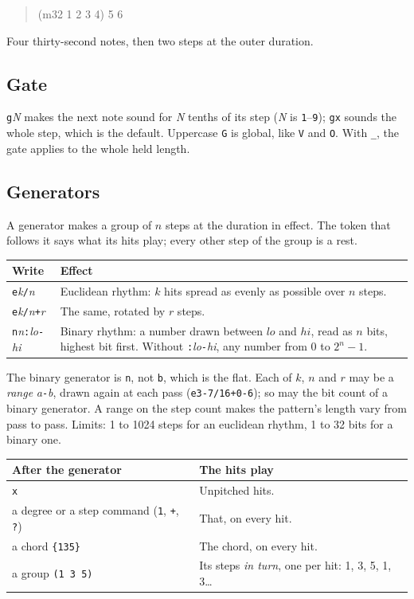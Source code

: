 \documentclass[11pt,a4paper]{article}
\newcommand{\pat}[1]{\texttt{#1}}
\newcommand{\meta}[1]{\textit{#1}}
\newenvironment{patternblock}
  {\begin{quote}\ttfamily\noindent}
  {\end{quote}}
\begin{document}
\begin{patternblock}
(m32 1 2 3 4) 5 6
\end{patternblock}
\noindent
Four thirty-second notes, then two steps at the outer duration.

\subsection{Gate}

\pat{g}\meta{N} makes the next note sound for \meta{N} tenths of its step
(\meta{N} is \pat{1}--\pat{9}); \pat{gx} sounds the whole step, which is the
default. Uppercase \pat{G} is global, like \pat{V} and \pat{O}. With \pat{\_},
the gate applies to the whole held length.

\subsection{Generators}

A generator makes a group of $n$ steps at the duration in effect. The token
that follows it says what its hits play; every other step of the group is a
rest.

\begin{center}
\begin{tabular}{@{}lp{85mm}@{}}
\toprule
\textbf{Write} & \textbf{Effect}\\
\midrule
\pat{e}\meta{k}\pat{/}\meta{n}            & Euclidean rhythm: $k$ hits spread as evenly as possible over $n$ steps.\\
\pat{e}\meta{k}\pat{/}\meta{n}\pat{+}\meta{r} & The same, rotated by $r$ steps.\\
\pat{n}\meta{n}\pat{:}\meta{lo}\pat{-}\meta{hi} & Binary rhythm: a number drawn between $lo$ and $hi$, read as $n$ bits, highest bit first. Without \pat{:}\meta{lo}\pat{-}\meta{hi}, any number from $0$ to $2^n-1$.\\
\bottomrule
\end{tabular}
\end{center}

The binary generator is \pat{n}, not \pat{b}, which is the flat. Each of $k$,
$n$ and $r$ may be a \emph{range} \meta{a}\pat{-}\meta{b}, drawn again at each
pass (\pat{e3-7/16+0-6}); so may the bit count of a binary generator. A range on
the step count makes the pattern's length vary from pass to pass. Limits: 1 to
1024 steps for an euclidean rhythm, 1 to 32 bits for a binary one.

\begin{center}
\begin{tabular}{@{}lp{85mm}@{}}
\toprule
\textbf{After the generator} & \textbf{The hits play}\\
\midrule
\pat{x}                 & Unpitched hits.\\
a degree or a step command (\pat{1}, \pat{+}, \pat{?}) & That, on every hit.\\
a chord \pat{\{135\}}   & The chord, on every hit.\\
a group \pat{(1 3 5)}   & Its steps \emph{in turn}, one per hit: 1, 3, 5, 1, 3\ldots\\
\bottomrule
\end{tabular}
\end{center}
\end{document}
